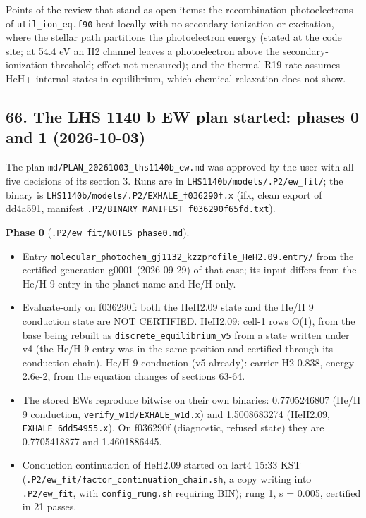 \documentclass[english,a4paper]{my_memo}
\providecommand{\tightlist}{\setlength{\itemsep}{0pt}\setlength{\parskip}{0pt}}
\begin{document}
Points of the review that stand as open items: the recombination
photoelectrons of \texttt{util\_ion\_eq.f90} heat locally with no secondary
ionization or excitation, where the stellar path partitions the
photoelectron energy (stated at the code site; at 54.4 eV an H2 channel
leaves a photoelectron above the secondary-ionization threshold; effect not
measured); and the thermal R19 rate assumes HeH+ internal states in
equilibrium, which chemical relaxation does not show.

\subsection{66. The LHS 1140 b EW plan started: phases 0 and 1 (2026-10-03)}\label{66-the-lhs-1140-b-ew-plan-started-phases-0-and-1-2026-10-03}

The plan \texttt{md/PLAN\_20261003\_lhs1140b\_ew.md} was approved by the user with
all five decisions of its section 3. Runs are in
\texttt{LHS1140b/models/.P2/ew\_fit/}; the binary is
\texttt{LHS1140b/models/.P2/EXHALE\_f036290f.x} (ifx, clean export of dd4a591,
manifest \texttt{.P2/BINARY\_MANIFEST\_f036290f65fd.txt}).

\textbf{Phase 0} (\texttt{.P2/ew\_fit/NOTES\_phase0.md}).

\begin{itemize}
\tightlist
\item
  Entry \texttt{molecular\_photochem\_gj1132\_kzzprofile\_HeH2.09.entry/} from the
  certified generation g0001 (2026-09-29) of that case; its input differs
  from the He/H 9 entry in the planet name and He/H only.
\item
  Evaluate-only on f036290f: both the HeH2.09 state and the He/H 9
  conduction state are NOT CERTIFIED. HeH2.09: cell-1 rows O(1), from the
  base being rebuilt as \texttt{discrete\_equilibrium\_v5} from a state written
  under v4 (the He/H 9 entry was in the same position and certified through
  its conduction chain). He/H 9 conduction (v5 already): carrier H2 0.838,
  energy 2.6e-2, from the equation changes of sections 63-64.
\item
  The stored EWs reproduce bitwise on their own binaries: 0.7705246807
  (He/H 9 conduction, \texttt{verify\_w1d/EXHALE\_w1d.x}) and 1.5008683274
  (HeH2.09, \texttt{EXHALE\_6dd54955.x}). On f036290f (diagnostic, refused state)
  they are 0.7705418877 and 1.4601886445.
\item
  Conduction continuation of HeH2.09 started on lart4 15:33 KST
  (\texttt{.P2/ew\_fit/factor\_continuation\_chain.sh}, a copy writing into
  \texttt{.P2/ew\_fit}, with \texttt{config\_rung.sh} requiring BIN); rung 1, s = 0.005,
  certified in 21 passes.
\end{itemize}
\end{document}
